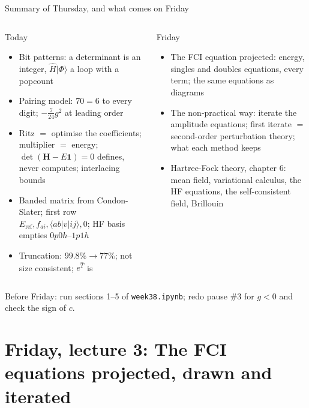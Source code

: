 \documentclass[aspectratio=169,10pt]{beamer}
\newcommand{\ket}[1]{\vert #1\rangle}
\newcommand{\element}[3]{\langle #1\vert #2\vert #3\rangle}
\begin{document}
\begin{frame}{Summary of Thursday, and what comes on Friday}
  \small
  \begin{columns}[T]
    \begin{block}{Today}
      \begin{itemize}
        \item Bit patterns: a determinant is an integer, $\hat{H}\ket{\Phi}$ a loop with a popcount
        \item Pairing model: $70=6$ to every digit; $-\frac{7}{24}g^2$ at leading order
        \item Ritz $=$ optimise the coefficients; multiplier $=$ energy; $\det(\bm{H}-E\bm{1})=0$ defines, never computes; interlacing bounds
        \item Banded matrix from Condon-Slater; first row $E_{\mathrm{ref}},f_{ai},\element{ab}{v}{ij},0$; HF basis empties $0p0h$--$1p1h$
        \item Truncation: $99.8\%\to77\%$; not size consistent; $e^{\hat{T}}$ is
      \end{itemize}
    \end{block}
    \begin{block}{Friday}
      \begin{itemize}
        \item The FCI equation projected: energy, singles and doubles equations, every term; the same equations as \alert{diagrams}
        \item The non-practical way: iterate the amplitude equations; first iterate $=$ second-order perturbation theory; what each method keeps
        \item Hartree-Fock theory, chapter 6: mean field, variational calculus, the HF equations, the self-consistent field, Brillouin
      \end{itemize}
    \end{block}
  \end{columns}
  \vspace{-0.3em}Before Friday: run sections 1--5 of \texttt{week38.ipynb}; redo pause \#3 for $g<0$ and check the sign of $c$.
\end{frame}

\section{Friday, lecture 3: The FCI equations projected, drawn and iterated}
\end{document}

